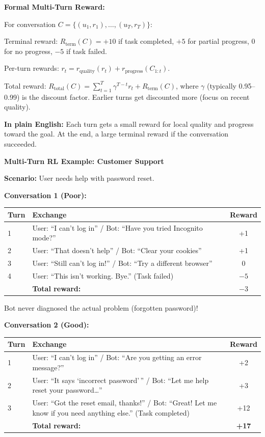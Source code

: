 \begin{chapterenv}
\begin{infobox}
\textbf{Formal Multi-Turn Reward:}

For conversation $C = \{(u_1, r_1), \ldots, (u_T, r_T)\}$:

Terminal reward: $R_{\text{term}}(C) = +10$ if task completed, $+5$ for partial progress, $0$ for no progress, $-5$ if task failed.

Per-turn rewards: $r_t = r_{\text{quality}}(r_t) + r_{\text{progress}}(C_{1:t})$.

Total reward: $R_{\text{total}}(C) = \sum_{t=1}^T \gamma^{T-t} r_t + R_{\text{term}}(C)$, where $\gamma$ (typically 0.95--0.99) is the discount factor. Earlier turns get discounted more (focus on recent quality).

\textbf{In plain English:} Each turn gets a small reward for local quality and progress toward the goal. At the end, a large terminal reward if the conversation succeeded.
\end{infobox}

\textbf{Multi-Turn RL Example: Customer Support}

\textbf{Scenario:} User needs help with password reset.

\textbf{Conversation 1 (Poor):}

\begin{center}
\begin{tabular}{lp{7cm}c}
\toprule
\textbf{Turn} & \textbf{Exchange} & \textbf{Reward} \\
\midrule
1 & User: ``I can't log in'' / Bot: ``Have you tried Incognito mode?'' & +1 \\
2 & User: ``That doesn't help'' / Bot: ``Clear your cookies'' & +1 \\
3 & User: ``Still can't log in!'' / Bot: ``Try a different browser'' & 0 \\
4 & User: ``This isn't working. Bye.'' (Task failed) & $-5$ \\
\midrule
& \textbf{Total reward:} & \textbf{$-3$} \\
\bottomrule
\end{tabular}
\end{center}

Bot never diagnosed the actual problem (forgotten password)!

\textbf{Conversation 2 (Good):}

\begin{center}
\begin{tabular}{lp{7cm}c}
\toprule
\textbf{Turn} & \textbf{Exchange} & \textbf{Reward} \\
\midrule
1 & User: ``I can't log in'' / Bot: ``Are you getting an error message?'' & +2 \\
2 & User: ``It says `incorrect password'\,'' / Bot: ``Let me help reset your password\ldots'' & +3 \\
3 & User: ``Got the reset email, thanks!'' / Bot: ``Great! Let me know if you need anything else.'' (Task completed) & +12 \\
\midrule
& \textbf{Total reward:} & \textbf{+17} \\
\bottomrule
\end{tabular}
\end{center}


\end{chapterenv}
